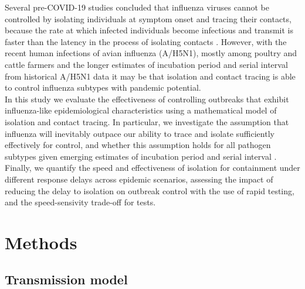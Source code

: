 \documentclass{article}
\begin{document}
Several pre-COVID-19 studies concluded that influenza viruses cannot be controlled by isolating individuals at symptom onset and tracing their contacts, because the rate at which infected individuals become infectious and transmit is faster than the latency in the process of isolating contacts \citep{fraserFactorsThatMake2004, klinkenbergEffectivenessContactTracing2006}. However, with the recent human infections of avian influenza (A/H5N1), mostly among poultry and cattle farmers \citep{gargHighlyPathogenicAvian2025} and the longer estimates of incubation period and serial interval from historical A/H5N1 data \citep{Ward2024.12.11.24318702} it may be that isolation and contact tracing is able to control influenza subtypes with pandemic potential. \\

In this study we evaluate the effectiveness of controlling outbreaks that exhibit influenza-like epidemiological characteristics using a mathematical model of isolation and contact tracing. In particular, we investigate the assumption that influenza will inevitably outpace our ability to trace and isolate sufficiently effectively for control, and whether this assumption holds for all pathogen subtypes given emerging estimates of incubation period and serial interval \citep{Ward2024.12.11.24318702}. Finally, we quantify the speed and effectiveness of isolation for containment under different response delays across epidemic scenarios, assessing the impact of reducing the delay to isolation on outbreak control with the use of rapid testing, and the speed-sensivity trade-off for tests.

\section*{Methods}

\subsection*{Transmission model}
\end{document}
